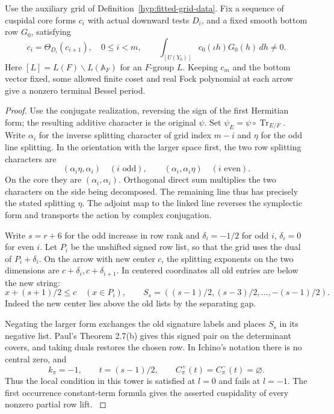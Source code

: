 \begin{auxlemma}\label{lem:fitted-fixed-ascent}
Use the auxiliary grid of Definition~\ref{hyp:fitted-grid-data}.
Fix a sequence of cuspidal core forms \(c_i\) with actual downward
tests \(D_i\), and a fixed smooth bottom row \(G_0\), satisfying
\[
 c_i=\Theta_{D_i}(c_{i+1}),\quad 0\le i<m,\qquad
 \int_{[U(Y_0)]} c_0(\iota h)G_0(h)\,dh\ne0 .
\]
Here \([L]=L(F)\backslash L(\mathbb A_F)\) for an \(F\)-group \(L\).
Keeping \(c_m\) and the bottom vector fixed, some allowed finite coset and real Fock polynomial
at each arrow give a nonzero terminal Bessel period.
\end{auxlemma}
\begin{proof}
Use the conjugate realization, reversing the sign of the first
Hermitian form; the resulting additive character is the original
\(\psi\). Set \(\psi_E=\psi\circ\operatorname{Tr}_{E/F}\). Write
\(\alpha_i\) for the inverse splitting character of grid index \(m-i\)
and \(\eta\) for the odd line splitting. In the orientation with the
larger space first, the two row splitting characters are
\[
 (\alpha_i\eta,\alpha_i)\quad(i\text{ odd}),\qquad
 (\alpha_i,\alpha_i\eta)\quad(i\text{ even}).
\]
On the core they are \((\alpha_i,\alpha_i)\). Orthogonal direct sum
multiplies the two characters on the side being decomposed. The
remaining line thus has precisely the stated splitting \(\eta\).
The adjoint map to the linked line reverses the symplectic form
and transports the action by complex conjugation.

Write \(s=r+6\) for the odd increase in row rank and
\(\delta_i=-1/2\) for odd \(i\), \(\delta_i=0\) for even \(i\).
Let \(P_i\) be the unshifted signed row list, so that the grid uses
the dual of \(P_i+\delta_i\). On the arrow with new center \(c\),
the splitting exponents on the two dimensions are
\(c+\delta_i,c+\delta_{i+1}\). In centered coordinates all old
entries are below the new string:
\[
       x+(s+1)/2\le c\quad(x\in P_i),\qquad
       S_s=((s-1)/2,(s-3)/2,\ldots,-(s-1)/2).
\]
Indeed the new center lies above the old lists by the separating gap.

Negating the larger form exchanges the old signature labels and places
\(S_s\) in its negative list. Paul's Theorem 2.7(b) gives this signed
pair on the determinant covers, and taking duals restores the chosen
row. In Ichino's notation there is no central zero, and
\[
 k_\pi=-1,\qquad t=(s-1)/2,\qquad C^+_\pi(t)=C^-_\pi(t)=\varnothing .
\]
 Thus the local condition
in this tower is satisfied at \(l=0\) and fails at \(l=-1\). The first
occurrence constant-term formula gives the asserted cuspidality of
every nonzero partial row lift. \cite{paul-real-core}
\cite[Theorem 6.1(i)]{ichino-real-core}


\end{proof}
